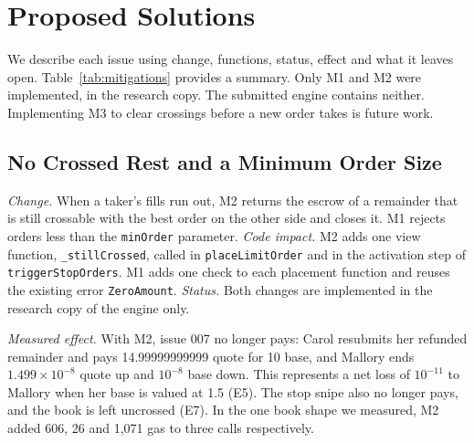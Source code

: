 \section{Proposed Solutions}\label{sec:solutions}

We describe each issue using change, functions, status, effect and what it leaves open. Table~\ref{tab:mitigations} provides a summary.
Only M1 and M2 were implemented, in the research copy. The submitted engine contains neither. Implementing M3 to clear crossings before a new order takes is future work. %

\subsection{No Crossed Rest and a Minimum Order Size}\label{sec:m12}
\emph{Change.}
When a taker's fills run out, M2 returns the escrow of a remainder that is still crossable with the best order on the other side and closes it. %
M1 rejects orders less than the \texttt{minOrder} parameter. %
\emph{Code impact.}
M2 adds one view function, \texttt{\_stillCrossed}, called in \texttt{placeLimitOrder} and in the activation step of \texttt{triggerStopOrders}. M1 adds one check to each placement function and reuses the existing error \texttt{ZeroAmount}. %
\emph{Status.} Both changes are implemented in the research copy of the engine only. %

\emph{Measured effect.}
With M2, issue 007 no longer pays: Carol resubmits her refunded remainder and pays 14.99999999999 quote for 10 base, and Mallory ends $1.499\times10^{-8}$ quote up and $10^{-8}$ base down. This represents a net loss of $10^{-11}$ to Mallory when her base is valued at 1.5 (E5). %
The stop snipe also no longer pays, and the book is left uncrossed (E7). %
In the one book shape we measured, M2 added 606, 26 and 1{,}071 gas to three calls respectively. %

